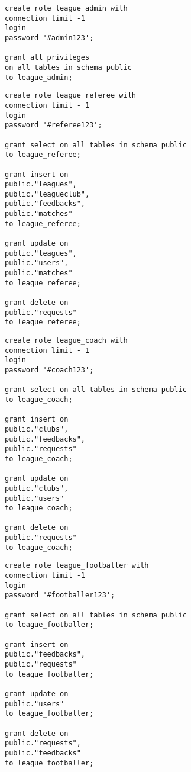 \begin{lstlisting}[caption={Создание роли администратора и выдыча права}, label={lst:role1}]
create role league_admin with
connection limit -1
login
password '#admin123';

grant all privileges
on all tables in schema public
to league_admin;
\end{lstlisting}

\begin{lstlisting}[caption={Создание роли судьи и выдыча права}, label={lst:role2}]
create role league_referee with
connection limit - 1
login
password '#referee123';

grant select on all tables in schema public
to league_referee;

grant insert on
public."leagues",
public."leagueclub",
public."feedbacks",
public."matches"
to league_referee;	

grant update on
public."leagues",
public."users",
public."matches"
to league_referee;

grant delete on
public."requests"
to league_referee;
\end{lstlisting}

\begin{lstlisting}[caption={Создание роли тренера и выдыча права}, label={lst:role3}]
create role league_coach with
connection limit - 1
login
password '#coach123';

grant select on all tables in schema public
to league_coach;

grant insert on
public."clubs",
public."feedbacks",
public."requests"
to league_coach;

grant update on
public."clubs",
public."users"
to league_coach;

grant delete on
public."requests"
to league_coach;

\end{lstlisting}

\begin{lstlisting}[caption={Создание роли футболиста и выдыча права}, label={lst:role4}]
create role league_footballer with
connection limit -1
login
password '#footballer123';

grant select on all tables in schema public
to league_footballer;

grant insert on
public."feedbacks",
public."requests"
to league_footballer;

grant update on
public."users"
to league_footballer;

grant delete on
public."requests",
public."feedbacks"
to league_footballer;
\end{lstlisting}

